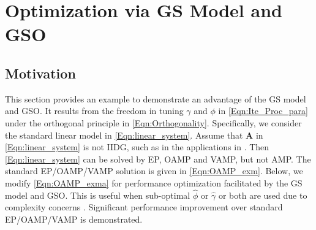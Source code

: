 \documentclass[journal]{IEEEtran}
\newcommand{\mr}{\mathrm}
\newcommand{\BE}{\begin{equation}}
\newcommand{\EE}{\end{equation}}
\renewcommand{\bf}{\bm}
\begin{document}
{\color{black} \section{Optimization via GS Model and GSO}\label{Sec:Optimization_OAMP}  


\subsection{Motivation}

This section provides an example to demonstrate an advantage of the GS model and GSO. It results from the freedom in tuning $\gamma$ and $\phi$ in \eqref{Eqn:Ite_Proc_para} under the orthogonal principle in \eqref{Eqn:Orthogonality}. Specifically, we consider the standard linear model in \eqref{Eqn:linear_system}. Assume that $\bf{A}$ in \eqref{Eqn:linear_system} is not IIDG, such as in the applications in \cite{He2018AI, Zhang2019AI, Takabe2019, OAMP_ISIT22, OAMP_TCOM, Yiyao_integral, Lei_TSP_2_2019, KhaniANSD2020, IC-SRC2021, Yiyao_ofdm, HWang2019, XZhou2022, ZhangOAMP2017, SLiu2022, LiOTFS2022,Yiyao_mmv, Fletcher2016}. Then \eqref{Eqn:linear_system} can be solved by EP, OAMP and VAMP, but not AMP. The standard EP/OAMP/VAMP solution is given in \eqref{Eqn:OAMP_exm}. Below, we  modify \eqref{Eqn:OAMP_exma} for performance optimization facilitated by the GS model and GSO. This is useful when sub-optimal $\hat{\phi}$ or $\hat{\gamma}$ or both are used due to complexity concerns \cite{Donoho2009}. Significant performance improvement over standard EP/OAMP/VAMP is demonstrated.}


\end{document}
